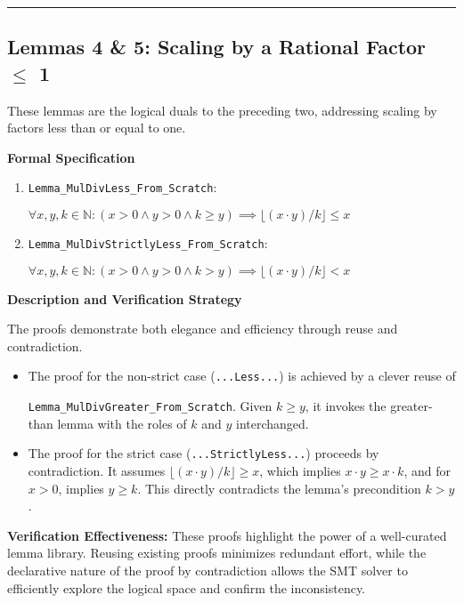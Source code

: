 \documentclass[
  english,
  onecolumn]{article}
\begin{document}
\begin{center}\rule{0.5\linewidth}{0.5pt}\end{center}

\subsection{\texorpdfstring{\textbf{Lemmas 4 \& 5: Scaling by a Rational
Factor \(\leq\)
1}}{Lemmas 4 \& 5: Scaling by a Rational Factor \textbackslash leq 1}}\label{lemmas-4-5-scaling-by-a-rational-factor-leq-1}

These lemmas are the logical duals to the preceding two, addressing
scaling by factors less than or equal to one.

\textbf{Formal Specification}

\begin{enumerate}
\def\labelenumi{\arabic{enumi}.}
\item
  \texttt{Lemma\_MulDivLess\_From\_Scratch}:

  \(\forall x, y, k \in \mathbb{N} : (x > 0 \land y > 0 \land k \ge y) \implies \lfloor(x \cdot y) / k\rfloor \le x\)
\item
  \texttt{Lemma\_MulDivStrictlyLess\_From\_Scratch}:

  \(\forall x, y, k \in \mathbb{N} : (x > 0 \land y > 0 \land k > y) \implies \lfloor(x \cdot y) / k\rfloor < x\)
\end{enumerate}

\textbf{Description and Verification Strategy}

The proofs demonstrate both elegance and efficiency through reuse and
contradiction.

\begin{itemize}
\item
  The proof for the non-strict case (\texttt{...Less...}) is achieved by
  a clever reuse of

  \texttt{Lemma\_MulDivGreater\_From\_Scratch}. Given \(k \ge y\), it
  invokes the greater-than lemma with the roles of \(k\) and \(y\)
  interchanged.
\item
  The proof for the strict case (\texttt{...StrictlyLess...}) proceeds
  by contradiction. It assumes \(\lfloor(x \cdot y)/k\rfloor \ge x\),
  which implies \(x \cdot y \ge x \cdot k\), and for \(x > 0\), implies
  \(y \ge k\). This directly contradicts the lemma's precondition
  \(k > y\).
\end{itemize}

\textbf{Verification Effectiveness:} These proofs highlight the power of
a well-curated lemma library. Reusing existing proofs minimizes
redundant effort, while the declarative nature of the proof by
contradiction allows the SMT solver to efficiently explore the logical
space and confirm the inconsistency.
\end{document}
